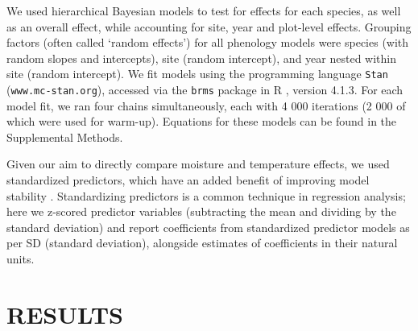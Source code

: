 \documentclass{article}
\begin{document}
\par We used hierarchical Bayesian models to test for effects for each species, as well as an overall effect, while accounting for site, year and plot-level effects. Grouping factors (often called `random effects') for all phenology models were species (with random slopes and intercepts), site (random intercept), and year nested within site (random intercept). We fit models using the programming language \texttt{Stan} \citep{Carpenter:2016aa} (\texttt{www.mc-stan.org}), accessed via the \texttt{brms}\citep{burkner2021} package in R \citep{rcoreteam2022}, version 4.1.3. For each model fit, we ran four chains simultaneously, each with 4 000 iterations (2 000 of which were used for warm-up). Equations for these models can be found in the Supplemental Methods. 
\par Given our aim to directly compare moisture and temperature effects, we used standardized predictors, which have an added benefit of improving model stability \citep{gelman2007}. Standardizing predictors is a common technique in regression analysis; here we z-scored predictor variables (subtracting the mean and dividing by the standard deviation) and report coefficients from standardized predictor models as per SD (standard deviation), alongside estimates of coefficients in their natural units. 
\section* {RESULTS}
\end{document}
